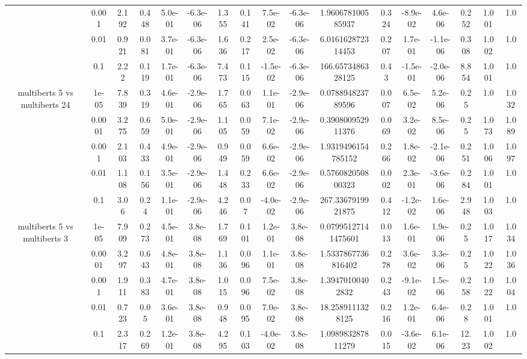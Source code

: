 \begin{tabular}{|c|c|c|c|c|c|c|c|c|c|c|c|c|c|c|c|c|}
 & 0.001 & 2.192 & 0.448 & 5.0e-01 & -6.3e-06 & 1.355 & 0.141 & 7.5e-02 & -6.3e-06 & 1.960678100585937 & 0.324 & -8.9e-02 & 4.6e-06 & 0.252 & 1.001 & 1.0 \\
 & 0.01 & 0.921 & 0.081 & 3.7e-01 & -6.3e-06 & 1.636 & 0.217 & 2.5e-02 & -6.3e-06 & 6.016162872314453 & 0.207 & 1.7e-01 & -1.1e-06 & 0.308 & 1.002 & 1.0 \\
 & 0.1 & 2.22 & 0.119 & 1.7e-01 & -6.3e-06 & 7.473 & 0.115 & -1.5e-02 & -6.3e-06 & 166.6573486328125 & 0.43 & -1.5e-01 & -2.0e-06 & 8.854 & 1.001 & 1.0 \\
\hline
\multirow{5}{*}{multiberts 5 vs multiberts 24} & 1e-05 & 7.839 & 0.319 & 4.6e-01 & -2.9e-06 & 1.765 & 0.063 & 1.1e-01 & -2.9e-06 & 0.078894823789596 & 0.007 & 6.5e-02 & 5.2e-06 & 0.25 & 1.0 & 1.032 \\
 & 0.0001 & 3.275 & 0.659 & 5.0e-01 & -2.9e-06 & 1.105 & 0.059 & 7.1e-02 & -2.9e-06 & 0.390800952911376 & 0.069 & 3.2e-02 & 8.5e-06 & 0.25 & 1.073 & 1.089 \\
 & 0.001 & 2.103 & 0.433 & 4.9e-01 & -2.9e-06 & 0.949 & 0.059 & 6.6e-02 & -2.9e-06 & 1.9319496154785152 & 0.266 & 1.8e-02 & -2.1e-06 & 0.251 & 1.006 & 1.097 \\
 & 0.01 & 1.108 & 0.156 & 3.5e-01 & -2.9e-06 & 1.448 & 0.233 & 6.6e-02 & -2.9e-06 & 0.576082050800323 & 0.002 & 2.3e-01 & -3.6e-06 & 0.284 & 1.001 & 1.0 \\
 & 0.1 & 3.06 & 0.24 & 1.1e-01 & -2.9e-06 & 4.246 & 0.07 & -4.0e-02 & -2.9e-06 & 267.3367919921875 & 0.412 & -1.2e-02 & 1.6e-06 & 2.948 & 1.003 & 1.0 \\
\hline
\multirow{5}{*}{multiberts 5 vs multiberts 3} & 1e-05 & 7.909 & 0.273 & 4.5e-01 & 3.8e-08 & 1.769 & 0.101 & 1.2e-01 & 3.8e-08 & 0.07995127141475601 & 0.013 & 1.6e-01 & 1.9e-06 & 0.25 & 1.017 & 1.034 \\
 & 0.0001 & 3.297 & 0.643 & 4.8e-01 & 3.8e-08 & 1.136 & 0.096 & 1.1e-01 & 3.8e-08 & 1.5337867736816402 & 0.278 & 3.6e-02 & 3.3e-06 & 0.25 & 1.022 & 1.036 \\
 & 0.001 & 1.911 & 0.383 & 4.7e-01 & 3.8e-08 & 1.015 & 0.096 & 7.5e-02 & 3.8e-08 & 1.39470100402832 & 0.243 & -9.1e-02 & 1.5e-06 & 0.258 & 1.022 & 1.004 \\
 & 0.01 & 0.723 & 0.05 & 3.6e-01 & 3.8e-08 & 0.948 & 0.095 & 7.0e-02 & 3.8e-08 & 18.2589111328125 & 0.216 & 1.2e-01 & 6.4e-06 & 0.28 & 1.001 & 1.0 \\
 & 0.1 & 2.317 & 0.269 & 1.2e-01 & 3.8e-08 & 4.295 & 0.103 & -4.0e-02 & 3.8e-08 & 1.098983287811279 & 0.015 & -3.6e-02 & 6.1e-06 & 12.23 & 1.002 & 1.0 \\

\end{tabular}
